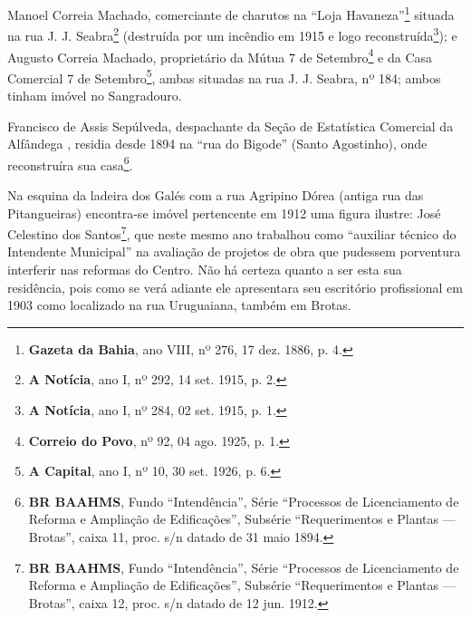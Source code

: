 Manoel Correia Machado, comerciante de charutos na ``Loja Havaneza''\footnote{\textbf{Gazeta da Bahia}, ano VIII, nº 276, 17 dez. 1886, p. 4.} situada na rua J. J. Seabra\footnote{\textbf{A Notícia}, ano I, nº 292, 14 set. 1915, p. 2.} (destruída por um incêndio em 1915 e logo reconstruída\footnote{\textbf{A Notícia}, ano I, nº 284, 02 set. 1915, p. 1.}); e Augusto Correia Machado, proprietário da Mútua 7 de Setembro\footnote{\textbf{Correio do Povo}, nº 92, 04 ago. 1925, p. 1.} e da Casa Comercial 7 de Setembro\footnote{\textbf{A Capital}, ano I, nº 10, 30 set. 1926, p. 6.}, ambas situadas na rua J. J. Seabra, nº 184; ambos tinham imóvel no Sangradouro. 

Francisco de Assis Sepúlveda, despachante da Seção de Estatística Comercial da Alfândega \cite[p.~306]{reis_almanak_1898}, residia desde 1894 na ``rua do Bigode'' (Santo Agostinho), onde reconstruíra sua casa\footnote{\textbf{BR BAAHMS}, Fundo ``Intendência'', Série ``Processos de Licenciamento de Reforma e Ampliação de Edificações'', Subsérie ``Requerimentos e Plantas --- Brotas'', caixa 11, proc. s/n datado de 31 maio 1894.}.

Na esquina da ladeira dos Galés com a rua Agripino Dórea (antiga rua das Pitangueiras) encontra-se imóvel pertencente em 1912 uma figura ilustre: José Celestino dos Santos\footnote{\textbf{BR BAAHMS}, Fundo ``Intendência'', Série ``Processos de Licenciamento de Reforma e Ampliação de Edificações'', Subsérie ``Requerimentos e Plantas --- Brotas'', caixa 12, proc. s/n datado de 12 jun. 1912.}, que neste mesmo ano trabalhou como ``auxiliar técnico do Intendente Municipal'' na avaliação de projetos de obra que pudessem porventura interferir nas reformas do Centro. Não há certeza quanto a ser esta sua residência, pois como se verá adiante ele apresentara seu escritório profissional em 1903 como localizado na rua Uruguaiana, também em Brotas.

